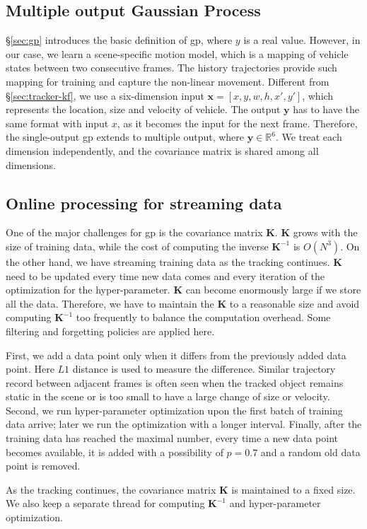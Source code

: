 \subsection{Multiple output Gaussian Process}

\S\ref{sec:gp} introduces the basic definition of \gls{gp}, where $y$ is a real value.
However, in our case, we learn a scene-specific motion model, which is a mapping of vehicle states between two consecutive frames. 
The history trajectories provide such mapping for training and capture the non-linear movement.
Different from \S\ref{sec:tracker-kf}, we use a six-dimension input $\mathbf{x} = [x, y, w, h, x', y']$, which represents the location, size and velocity of vehicle. 
The output $\mathbf{y}$ has to have the same format with input $x$, as it becomes the input for the next frame.
Therefore, the single-output \gls{gp} extends to multiple output, where $\mathbf{y} \in \mathbb{R}^{6}$. 
We treat each dimension independently, and the covariance matrix is shared among all dimensions.

\subsection{Online processing for streaming data}

One of the major challenges for \gls{gp} is the covariance matrix $\mathbf{K}$. 
$\mathbf{K}$ grows with the size of training data, while the cost of computing the inverse $\mathbf{K}^{-1}$ is $O(N^3)$.
On the other hand, we have streaming training data as the tracking continues. 
$\mathbf{K}$ need to be updated every time new data comes and every iteration of the optimization for the hyper-parameter.
$\mathbf{K}$ can become enormously large if we store all the data. 
Therefore, we have to maintain the $\mathbf{K}$ to a reasonable size and avoid computing $\mathbf{K}^{-1}$ too frequently to balance the computation overhead.
Some filtering and forgetting policies are applied here.

First, we add a data point only when it differs from the previously added data point.
Here $L1$ distance is used to measure the difference. 
Similar trajectory record between adjacent frames is often seen when the tracked object remains static in the scene or is too small to have a large change of size or velocity.
Second, we run hyper-parameter optimization upon the first batch of training data arrive; later we run the optimization with a longer interval.
Finally, after the training data has reached the maximal number, every time a new data point becomes available, it is added with a possibility of $p = 0.7$ and a random old data point is removed.

As the tracking continues, the covariance matrix $\mathbf{K}$ is maintained to a fixed size. 
We also keep a separate thread for computing $\mathbf{K}^{-1}$ and hyper-parameter optimization. 


